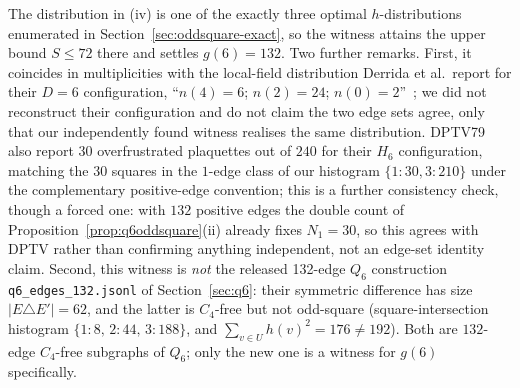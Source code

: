 \documentclass[12pt]{article}
\begin{document}
The distribution in (iv) is one of the exactly three optimal
$h$-distributions enumerated in Section~\ref{sec:oddsquare-exact}, so
the witness attains the upper bound $S\le72$ there and settles
$g(6)=132$. Two further remarks. First, it coincides in multiplicities
with the local-field distribution Derrida et al.\ report for their
$D=6$ configuration, ``$n(4)=6$; $n(2)=24$; $n(0)=2$''~\cite[p.~622]{DPTV79};
we did not reconstruct their configuration and do not claim the two
edge sets agree, only that our independently found witness realises the
same distribution. DPTV79 also report $30$ overfrustrated plaquettes out of
$240$ for their $H_6$ configuration, matching the $30$ squares in the
$1$-edge class of our histogram $\{1{:}30,3{:}210\}$ under the complementary
positive-edge convention; this is a further consistency check, though a forced one: with $132$ positive edges the double count of Proposition~\ref{prop:q6oddsquare}(ii) already fixes $N_1=30$, so this agrees with DPTV rather than confirming anything independent, not an edge-set
identity claim. Second, this witness is \emph{not} the released
132-edge $Q_6$ construction \texttt{q6\_edges\_132.jsonl} of
Section~\ref{sec:q6}: their symmetric difference has size $|E\triangle E'|=62$, and the
latter is $C_4$-free but not odd-square (square-intersection histogram
$\{1\!:\!8,\,2\!:\!44,\,3\!:\!188\}$, and
$\sum_{v\in U}h(v)^2=176\ne192$). Both are $132$-edge $C_4$-free
subgraphs of $Q_6$; only the new one is a witness for $g(6)$
specifically.
\end{document}
